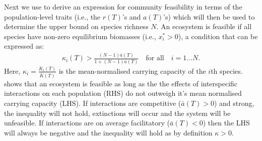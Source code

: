 \documentclass{article}
\begin{document}
Next we use  to derive an expression for community feasibility in terms of the population-level traits (i.e., the $r(T)$'s and $a(T)$'s) which will then be used to determine the upper bound on species richness $N$. An ecosystem is feasible if all species have non-zero equilibrium biomasses (i.e., $x_i^* > 0 $), a condition that can be expressed as:
\begin{align} \label{EQ:Feas_sp}
  \kappa_i(T) > \frac{(N-1)\bar{a}(T)}{1 + (N-1)\bar{a}(T)} \quad \text{for all} \quad i = 1 \ldots N.
\end{align}
Here, $\kappa_i = \frac{K_i(T)}{\bar{K}(T)}$ is the mean-normalised carrying capacity of the $i$th species.  shows that an ecosystem is feasible as long as the the effects of interspecific interactions on each population (RHS) do not outweigh it's mean normalised carrying capacity (LHS). If interactions are competitive ($\bar{a}(T) > 0$) and strong, the inequality will not hold, extinctions will occur and the system will be unfeasible. If interactions are on average facilitatory ($\bar{a}(T) < 0$) then the LHS will always be negative and the inequality will hold as by definition $\kappa > 0$. 
\end{document}
